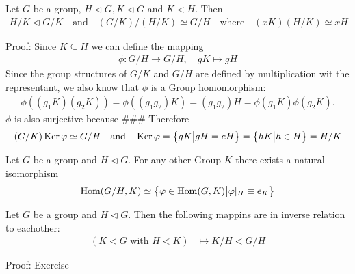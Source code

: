 \begin{corollary}
Let $G$ be a group, $H \lhd G, K \lhd G$ and $K < H$. Then
\begin{align*}
	H/K \lhd G/K \quad \text{and} \quad (G/K)/(H/K) \simeq G/H \quad \text{where} \quad (xK)(H/K) \simeq xH
\end{align*}
\end{corollary}
Proof: Since $K \subseteq H$ we can define the mapping
\begin{align*}
	\phi: G/H \to G/H, \quad gK \mapsto gH
\end{align*}
Since the group structures of $G/K$ and $G/H$ are defined by multiplication wit the representant, we also know that $\phi$ is a Group homomorphism:
\begin{align*}
	\phi\left((g_1K)(g_2K)\right) = \phi\left((g_1g_2)K\right) = (g_1g_2)H = \phi(g_1K)\phi(g_2K).
\end{align*}
$\phi$ is also surjective because \#\#\#
Therefore
\begin{align*}
	(G/K)\operatorname{Ker} \varphi \simeq G/H \quad \text{and} \quad \operatorname{Ker} \varphi = \left\{gK \big\vert gH = eH\right\} = \left\{hK \big\vert h \in H\right\} = H/K
\end{align*}


\begin{corollary}
	Let $G$ be a group and $H \lhd G$. For any other Group $K$ there exists a natural isomorphism 
	\begin{align*}
		\operatorname{Hom}(G/H,K) \simeq \left\{\varphi \in \operatorname{Hom}(G,K) \big\vert \varphi|_H \equiv e_K\right\}
	\end{align*}
\end{corollary}

\begin{corollary}[]
Let $G$ be a group and $H \lhd G$. Then the following mappins are in inverse relation to eachother:
\begin{align*}
	(K < G \text{ with } H < K) &\mapsto K/H < G/H
\end{align*}
\end{corollary}
Proof: Exercise


